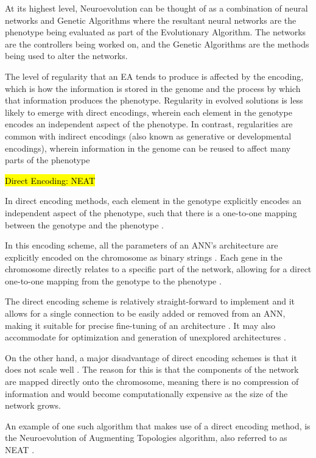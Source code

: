 At its highest level, Neuroevolution can be thought of as a combination of neural networks and Genetic Algorithms where the resultant neural networks are the phenotype being evaluated as part of the Evolutionary Algorithm.
The networks are the controllers being worked on, and the Genetic Algorithms are the methods being used to alter the networks.



The level of regularity that an EA tends to produce is affected by the encoding, which is how the information is stored in the genome and the process by which that information produces the phenotype. 
Regularity in evolved solutions is less likely to emerge with direct encodings, wherein each element in the genotype encodes an independent aspect of the phenotype.
In contrast, regularities are common with indirect encodings (also known as generative or developmental encodings), wherein information in the genome can be reused to affect many parts of the phenotype


 
\hl{Direct Encoding: NEAT}

In direct encoding methods, each element in the genotype explicitly encodes an independent aspect of the phenotype, such that there is a one-to-one mapping between the genotype and the phenotype \cite{clune2011performance,stanley2009hypercube}.

In this encoding scheme, all the parameters of an ANN's architecture are explicitly encoded on the chromosome as binary strings \cite{Gomez2003}. Each gene in the chromosome directly relates to a specific part of the network, allowing for a direct one-to-one mapping from the genotype to the phenotype \cite{StanleyMiikkulainen2002}.

The direct encoding scheme is relatively straight-forward to implement and it allows for a single connection to be easily added or removed from an ANN, making it suitable for precise fine-tuning of an architecture \cite{StanleyMiikkulainen2002}.
It may also accommodate for optimization and generation of unexplored architectures \cite{miller1989designing}.

On the other hand, a major disadvantage of direct encoding schemes is that it does not scale well \cite{XinYao1999}.  The reason for this is that the components of the network are mapped directly onto the chromosome, meaning there is no compression of information and would become computationally expensive as the size of the network grows.

An example of one such algorithm that makes use of a direct encoding method, is the Neuroevolution of Augmenting Topologies algorithm, also referred to as NEAT \cite{Gomez2003}.

